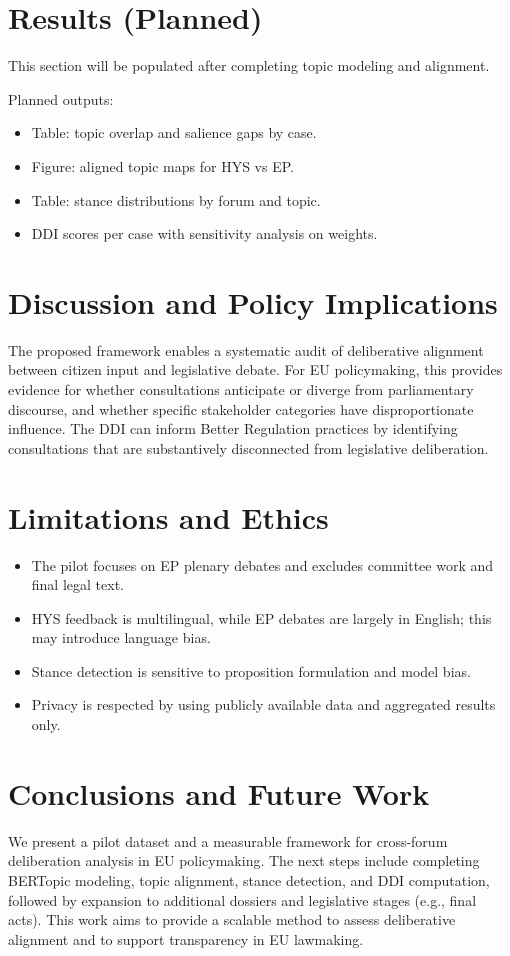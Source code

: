 \documentclass[11pt,a4paper]{article}
\begin{document}
\section{Results (Planned)}
This section will be populated after completing topic modeling and alignment.

Planned outputs:
\begin{itemize}
  \item Table: topic overlap and salience gaps by case.
  \item Figure: aligned topic maps for HYS vs EP.
  \item Table: stance distributions by forum and topic.
  \item DDI scores per case with sensitivity analysis on weights.
\end{itemize}

\section{Discussion and Policy Implications}
The proposed framework enables a systematic audit of deliberative alignment between citizen input and legislative debate. For EU policymaking, this provides evidence for whether consultations anticipate or diverge from parliamentary discourse, and whether specific stakeholder categories have disproportionate influence. The DDI can inform Better Regulation practices by identifying consultations that are substantively disconnected from legislative deliberation.

\section{Limitations and Ethics}
\begin{itemize}
  \item The pilot focuses on EP plenary debates and excludes committee work and final legal text.
  \item HYS feedback is multilingual, while EP debates are largely in English; this may introduce language bias.
  \item Stance detection is sensitive to proposition formulation and model bias.
  \item Privacy is respected by using publicly available data and aggregated results only.
\end{itemize}

\section{Conclusions and Future Work}
We present a pilot dataset and a measurable framework for cross-forum deliberation analysis in EU policymaking. The next steps include completing BERTopic modeling, topic alignment, stance detection, and DDI computation, followed by expansion to additional dossiers and legislative stages (e.g., final acts). This work aims to provide a scalable method to assess deliberative alignment and to support transparency in EU lawmaking.
\end{document}
